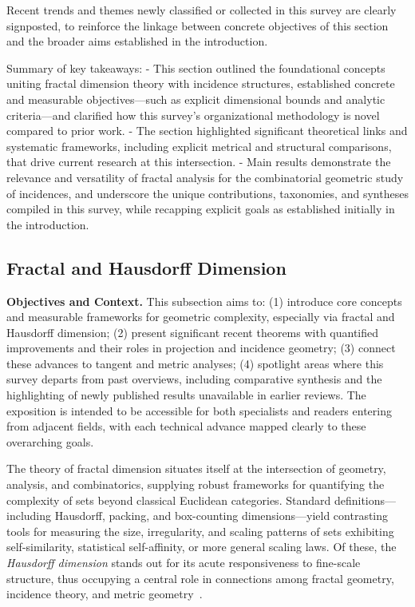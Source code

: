 \documentclass[sigconf]{acmart}
\begin{document}
Recent trends and themes newly classified or collected in this survey are clearly signposted, to reinforce the linkage between concrete objectives of this section and the broader aims established in the introduction.

Summary of key takeaways:
- This section outlined the foundational concepts uniting fractal dimension theory with incidence structures, established concrete and measurable objectives—such as explicit dimensional bounds and analytic criteria—and clarified how this survey's organizational methodology is novel compared to prior work.
- The section highlighted significant theoretical links and systematic frameworks, including explicit metrical and structural comparisons, that drive current research at this intersection.
- Main results demonstrate the relevance and versatility of fractal analysis for the combinatorial geometric study of incidences, and underscore the unique contributions, taxonomies, and syntheses compiled in this survey, while recapping explicit goals as established initially in the introduction.

\subsection{Fractal and Hausdorff Dimension}

\textbf{Objectives and Context.} This subsection aims to: (1) introduce core concepts and measurable frameworks for geometric complexity, especially via fractal and Hausdorff dimension; (2) present significant recent theorems with quantified improvements and their roles in projection and incidence geometry; (3) connect these advances to tangent and metric analyses; (4) spotlight areas where this survey departs from past overviews, including comparative synthesis and the highlighting of newly published results unavailable in earlier reviews. The exposition is intended to be accessible for both specialists and readers entering from adjacent fields, with each technical advance mapped clearly to these overarching goals.

The theory of fractal dimension situates itself at the intersection of geometry, analysis, and combinatorics, supplying robust frameworks for quantifying the complexity of sets beyond classical Euclidean categories. Standard definitions—including Hausdorff, packing, and box-counting dimensions—yield contrasting tools for measuring the size, irregularity, and scaling patterns of sets exhibiting self-similarity, statistical self-affinity, or more general scaling laws. Of these, the \emph{Hausdorff dimension} stands out for its acute responsiveness to fine-scale structure, thus occupying a central role in connections among fractal geometry, incidence theory, and metric geometry~\cite{ref68}. 
\end{document}
